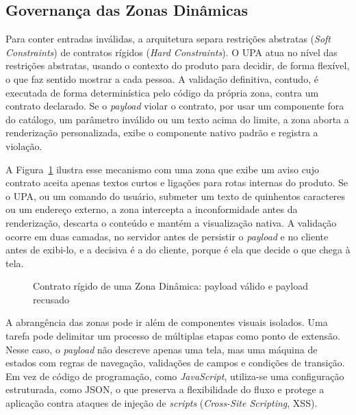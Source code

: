 \subsection{Governança das Zonas Dinâmicas}\label{sec:4.5.5}

Para conter entradas inválidas, a arquitetura separa restrições abstratas (\textit{Soft Constraints}) de contratos rígidos (\textit{Hard Constraints}). O UPA atua no nível das restrições abstratas, usando o contexto do produto para decidir, de forma flexível, o que faz sentido mostrar a cada pessoa. A validação definitiva, contudo, é executada de forma determinística pelo código da própria zona, contra um contrato declarado. Se o \textit{payload} violar o contrato, por usar um componente fora do catálogo, um parâmetro inválido ou um texto acima do limite, a zona aborta a renderização personalizada, exibe o componente nativo padrão e registra a violação.

A Figura~\ref{fig:6} ilustra esse mecanismo com uma zona que exibe um aviso cujo contrato aceita apenas textos curtos e ligações para rotas internas do produto. Se o UPA, ou um comando do usuário, submeter um texto de quinhentos caracteres ou um endereço externo, a zona intercepta a inconformidade antes da renderização, descarta o conteúdo e mantém a visualização nativa. A validação ocorre em duas camadas, no servidor antes de persistir o \textit{payload} e no cliente antes de exibi-lo, e a decisiva é a do cliente, porque é ela que decide o que chega à tela.

\begin{figure}[htb]
\centering
\caption{Contrato rígido de uma Zona Dinâmica: payload válido e payload recusado}
\label{fig:6}
\end{figure}

A abrangência das zonas pode ir além de componentes visuais isolados. Uma tarefa pode delimitar um processo de múltiplas etapas como ponto de extensão. Nesse caso, o \textit{payload} não descreve apenas uma tela, mas uma máquina de estados com regras de navegação, validações de campos e condições de transição. Em vez de código de programação, como \textit{JavaScript}, utiliza-se uma configuração estruturada, como JSON, o que preserva a flexibilidade do fluxo e protege a aplicação contra ataques de injeção de \textit{scripts} (\textit{Cross-Site Scripting}, XSS).

